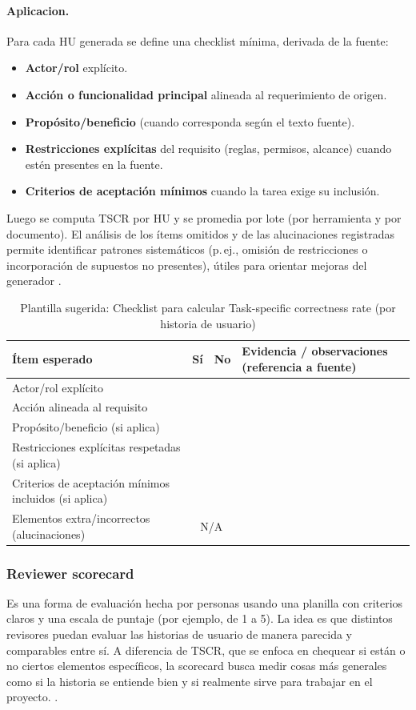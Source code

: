 \paragraph{Aplicacion.}
Para cada HU generada se define una checklist mínima, derivada de la fuente:
\begin{itemize}
    \item \textbf{Actor/rol} explícito.
    \item \textbf{Acción o funcionalidad principal} alineada al requerimiento de origen.
    \item \textbf{Propósito/beneficio} (cuando corresponda según el texto fuente).
    \item \textbf{Restricciones explícitas} del requisito (reglas, permisos, alcance) cuando estén presentes en la fuente.
    \item \textbf{Criterios de aceptación mínimos} cuando la tarea exige su inclusión.
\end{itemize}
Luego se computa TSCR por HU y se promedia por lote (por herramienta y por documento). El análisis de los ítems omitidos y de las alucinaciones registradas permite identificar patrones sistemáticos (p.\,ej., omisión de restricciones o incorporación de supuestos no presentes), útiles para orientar mejoras del generador \cite{yu2026evaluating_genai_quality_multicase}.

\begin{table}[h!]
\centering
\begin{tabular}{|p{6cm}|c|c|p{5.5cm}|}
\hline
\textbf{Ítem esperado} & \textbf{Sí} & \textbf{No} & \textbf{Evidencia / observaciones (referencia a fuente)} \\
\hline
Actor/rol explícito &  &  &  \\
\hline
Acción alineada al requisito &  &  &  \\
\hline
Propósito/beneficio (si aplica) &  &  &  \\
\hline
Restricciones explícitas respetadas (si aplica) &  &  &  \\
\hline
Criterios de aceptación mínimos incluidos (si aplica) &  &  &  \\
\hline
Elementos extra/incorrectos (alucinaciones) & \multicolumn{2}{c|}{N/A} &  \\
\hline
\end{tabular}
\caption{Plantilla sugerida: Checklist para calcular Task-specific correctness rate (por historia de usuario)}
\end{table}

\subsubsection{Reviewer scorecard}
Es una forma de evaluación hecha por personas usando una planilla con criterios claros y una escala de puntaje (por ejemplo, de 1 a 5). La idea es que distintos revisores puedan evaluar las historias de usuario de manera parecida y comparables entre sí. A diferencia de TSCR, que se enfoca en chequear si están o no ciertos elementos específicos, la scorecard busca medir cosas más generales como si la historia se entiende bien y si realmente sirve para trabajar en el proyecto.
\cite{yu2026evaluating_genai_quality_multicase}.

